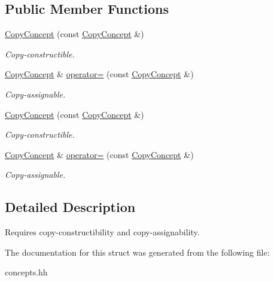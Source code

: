 \subsection*{Public Member Functions}
\begin{DoxyCompactItemize}
\item 
\hypertarget{structRFFGen_1_1Concepts_1_1CopyConcept_a8c65652314ce23b53ff82ff5c1e6d7a2}{\hyperlink{structRFFGen_1_1Concepts_1_1CopyConcept_a8c65652314ce23b53ff82ff5c1e6d7a2}{Copy\-Concept} (const \hyperlink{structRFFGen_1_1Concepts_1_1CopyConcept}{Copy\-Concept} \&)}\label{structRFFGen_1_1Concepts_1_1CopyConcept_a8c65652314ce23b53ff82ff5c1e6d7a2}

\begin{DoxyCompactList}\small\item\em Copy-\/constructible. \end{DoxyCompactList}\item 
\hypertarget{structRFFGen_1_1Concepts_1_1CopyConcept_a14e42cfa42f78c5142bd51b24e9056bc}{\hyperlink{structRFFGen_1_1Concepts_1_1CopyConcept}{Copy\-Concept} \& \hyperlink{structRFFGen_1_1Concepts_1_1CopyConcept_a14e42cfa42f78c5142bd51b24e9056bc}{operator=} (const \hyperlink{structRFFGen_1_1Concepts_1_1CopyConcept}{Copy\-Concept} \&)}\label{structRFFGen_1_1Concepts_1_1CopyConcept_a14e42cfa42f78c5142bd51b24e9056bc}

\begin{DoxyCompactList}\small\item\em Copy-\/assignable. \end{DoxyCompactList}\item 
\hypertarget{structRFFGen_1_1Concepts_1_1CopyConcept_a8c65652314ce23b53ff82ff5c1e6d7a2}{\hyperlink{structRFFGen_1_1Concepts_1_1CopyConcept_a8c65652314ce23b53ff82ff5c1e6d7a2}{Copy\-Concept} (const \hyperlink{structRFFGen_1_1Concepts_1_1CopyConcept}{Copy\-Concept} \&)}\label{structRFFGen_1_1Concepts_1_1CopyConcept_a8c65652314ce23b53ff82ff5c1e6d7a2}

\begin{DoxyCompactList}\small\item\em Copy-\/constructible. \end{DoxyCompactList}\item 
\hypertarget{structRFFGen_1_1Concepts_1_1CopyConcept_a14e42cfa42f78c5142bd51b24e9056bc}{\hyperlink{structRFFGen_1_1Concepts_1_1CopyConcept}{Copy\-Concept} \& \hyperlink{structRFFGen_1_1Concepts_1_1CopyConcept_a14e42cfa42f78c5142bd51b24e9056bc}{operator=} (const \hyperlink{structRFFGen_1_1Concepts_1_1CopyConcept}{Copy\-Concept} \&)}\label{structRFFGen_1_1Concepts_1_1CopyConcept_a14e42cfa42f78c5142bd51b24e9056bc}

\begin{DoxyCompactList}\small\item\em Copy-\/assignable. \end{DoxyCompactList}\end{DoxyCompactItemize}


\subsection{Detailed Description}
Requires copy-\/constructibility and copy-\/assignability. 

The documentation for this struct was generated from the following file\-:\begin{DoxyCompactItemize}
\item 
concepts.\-hh\end{DoxyCompactItemize}
